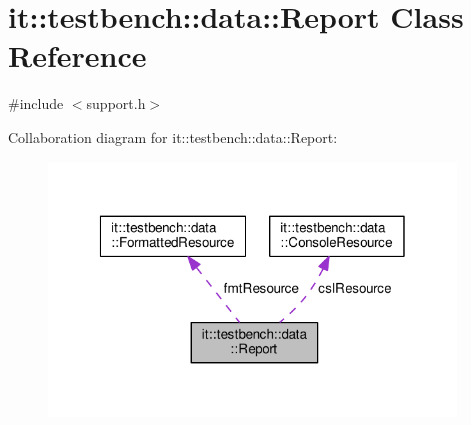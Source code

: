 \hypertarget{classit_1_1testbench_1_1data_1_1Report}{\section{it\-:\-:testbench\-:\-:data\-:\-:Report Class Reference}
\label{d5/de8/classit_1_1testbench_1_1data_1_1Report}
}


{\ttfamily \#include $<$support.\-h$>$}



Collaboration diagram for it\-:\-:testbench\-:\-:data\-:\-:Report\-:
\nopagebreak
\begin{figure}[H]
\begin{center}
\leavevmode
\includegraphics[width=307pt]{dd/de4/classit_1_1testbench_1_1data_1_1Report__coll__graph}
\end{center}
\end{figure}
